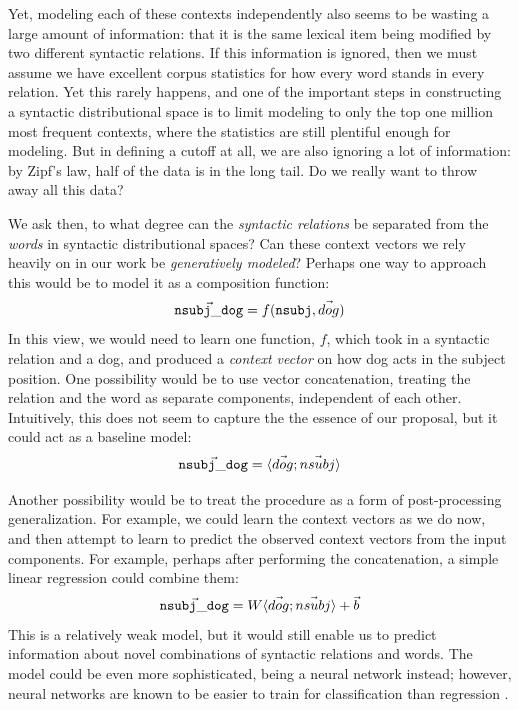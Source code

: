 \documentclass[letterpaper]{article}
\begin{document}
Yet, modeling each of these contexts independently also seems to be wasting
a large amount of information: that it is the same lexical item being modified
by two different syntactic relations. If this information is ignored, then
we must assume we have excellent corpus statistics for how every word stands
in every relation. Yet this rarely happens, and one of the important
steps in constructing a syntactic distributional space is to limit modeling
to only the top one million most frequent contexts, where the statistics are
still plentiful enough for modeling. But in defining a cutoff at all, we
are also ignoring a lot of information: by Zipf's law, half of the data
is in the long tail. Do we really want to throw away all this data?

We ask then, to what degree can the {\em syntactic relations} be separated
from the {\em words} in syntactic distributional spaces? 
Can these context vectors we rely heavily on in our work be {\em generatively
modeled}? Perhaps one way to approach this would be to model it as a
composition function:
\begin{equation*}
  \vec{ {\tt nsubj\_dog} } = f({\tt nsubj}, \vec{dog})
\end{equation*}
In this view, we would need to learn one function, $f$, which took in a syntactic
relation and a dog, and produced a {\em context vector} on how dog acts in the
subject position. One possibility would be to use vector concatenation,
treating the relation and the word as separate components, independent of each
other. Intuitively, this does not seem to capture the the essence of our
proposal, but it could act as a baseline model:
\begin{equation*}
  \vec{ {\tt nsubj\_dog} } = \langle \vec{dog} ; \vec{nsubj} \rangle
\end{equation*}

Another possibility would be to treat the procedure as a form of post-processing
generalization. For example, we could learn the context vectors as we do now, and
then attempt to learn to predict the observed context vectors from the input
components. For example, perhaps after performing the concatenation, a simple
linear regression could combine them:
\begin{equation*}
  \vec{ {\tt nsubj\_dog} } = W\langle \vec{dog} ; \vec{nsubj} \rangle + \vec{b}
\end{equation*}
This is a relatively weak model, but it would still enable us to predict
information about novel combinations of syntactic relations and words. The
model could be even more sophisticated, being a neural network instead; however,
neural networks are known to be easier to train for classification than
regression \cite{needcite}.
\end{document}
